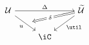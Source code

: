 \[\begin{tikzcd}
	\Ty && \Tm \\
	& \iC
	\arrow["\Delta", from=1-1, to=1-3]
	\arrow[""{name=0, anchor=center, inner sep=0}, "u"', from=1-1, to=2-2]
	\arrow["\util", from=1-3, to=2-2]
	\arrow["\delta"{description}, shorten >=8pt, Rightarrow, from=1-3, to=0]
\end{tikzcd}\]